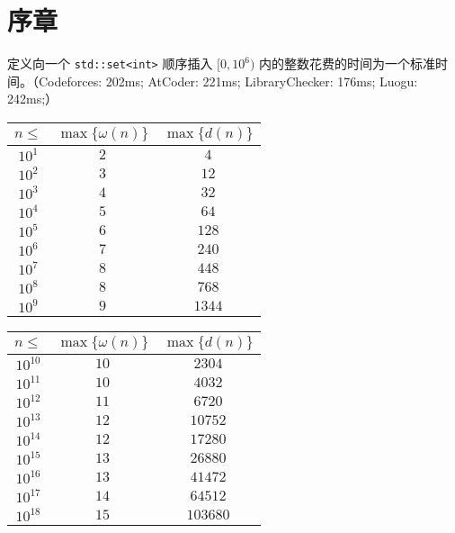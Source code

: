 \section{序章}

定义向一个 \lstinline{std::set<int>} 顺序插入 $[0, 10^6)$ 内的整数花费的时间为一个标准时间。（Codeforces: 202ms; AtCoder: 221ms; LibraryChecker: 176ms; Luogu: 242ms;）

\begin{multicols}{2}
\noindent
\begin{tabular}{|c|c|c|}
\hline
$n \le$ & $\max\{\omega(n)\}$ & $\max\{d(n)\}$ \\
\hline
$10^{1}$ & $2$ & $4$ \\
\hline
$10^{2}$ & $3$ & $12$ \\
\hline
$10^{3}$ & $4$ & $32$ \\
\hline
$10^{4}$ & $5$ & $64$ \\
\hline
$10^{5}$ & $6$ & $128$ \\
\hline
$10^{6}$ & $7$ & $240$ \\
\hline
$10^{7}$ & $8$ & $448$ \\
\hline
$10^{8}$ & $8$ & $768$ \\
\hline
$10^{9}$ & $9$ & $1344$ \\
\hline
\end{tabular}

\vspace{1em}

\noindent
\begin{tabular}{|c|c|c|}
\hline
$n \le$ & $\max\{\omega(n)\}$ & $\max\{d(n)\}$ \\
\hline
$10^{10}$ & $10$ & $2304$ \\
\hline
$10^{11}$ & $10$ & $4032$ \\
\hline
$10^{12}$ & $11$ & $6720$ \\
\hline
$10^{13}$ & $12$ & $10752$ \\
\hline
$10^{14}$ & $12$ & $17280$ \\
\hline
$10^{15}$ & $13$ & $26880$ \\
\hline
$10^{16}$ & $13$ & $41472$ \\
\hline
$10^{17}$ & $14$ & $64512$ \\
\hline
$10^{18}$ & $15$ & $103680$ \\
\hline
\end{tabular}
\end{multicols}




